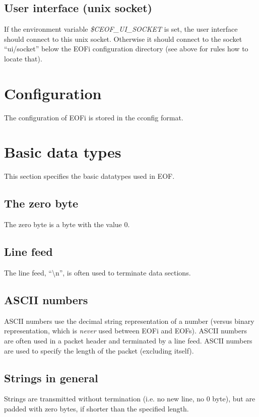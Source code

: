 \documentclass[12pt,a4paper]{book}
\begin{document}
\subsection{User interface (unix socket)}
\label{ui-socket}
If the environment variable \textit{\$CEOF\_UI\_SOCKET} is set, the user
interface should connect to this unix socket. Otherwise it should connect
to the socket "`ui/socket"' below the EOFi configuration directory
(see above for rules how to locate that).
\section{Configuration}
The configuration of EOFi is stored in the cconfig\cite{cconfig} format.
\section{Basic data types}
This section specifies the basic datatypes used in EOF.
\subsection{The zero byte}
The zero byte is a byte with the value 0.
\subsection{Line feed}
The line feed, "`\textbackslash{}n"', is often used to terminate data
sections.
\subsection{ASCII numbers}
ASCII numbers use the decimal string representation of a number (versus
binary representation, which is \emph{never} used between EOFi and EOFs).
ASCII numbers are often used in a packet header and terminated by a
line feed. ASCII numbers are used to specify the length of the packet
(excluding itself).
\subsection{Strings in general}
Strings are transmitted without termination (i.e. no new line, no 0 byte),
but are padded with zero bytes, if shorter than the specified length.
\end{document}
